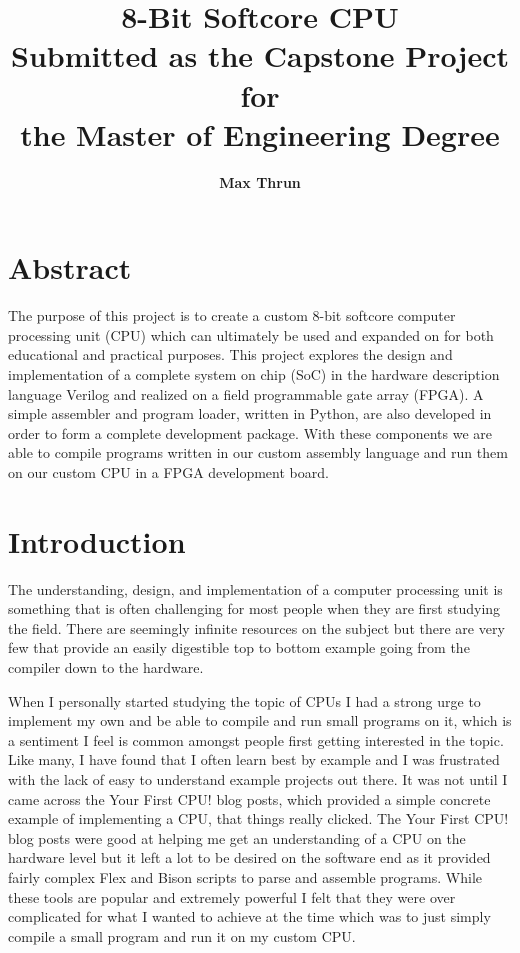 \documentclass[10pt]{article}
\title{
    \vspace{0.5in}
    \textmd{\textbf{8-Bit Softcore CPU}}\\
    \vspace{2in}
    \textmd{\textbf{Submitted as the Capstone Project for\\the Master of Engineering Degree}}\\
    \vfill
}
\author{\textbf{Max Thrun}}
\begin{document}
\clearpage\maketitle
\thispagestyle{empty}
\newpage
\section{Abstract}

The purpose of this project is to create a custom 8-bit softcore computer
processing unit (CPU) which can ultimately be used and expanded on for both
educational and practical purposes. This project explores the design and
implementation of a complete system on chip (SoC) in the hardware description
language Verilog and realized on a field programmable gate array (FPGA). A
simple assembler and program loader, written in Python, are also developed in
order to form a complete development package. With these components we are able
to compile programs written in our custom assembly language and run them on our
custom CPU in a FPGA development board.

\section{Introduction}

The understanding, design, and implementation of a computer processing unit is
something that is often challenging for most people when they are first
studying the field. There are seemingly infinite resources on the subject but
there are very few that provide an easily digestible top to bottom example
going from the compiler down to the hardware.

When I personally started studying the topic of CPUs I had a strong urge to
implement my own and be able to compile and run small programs on it, which is a
sentiment I feel is common amongst people first getting interested in the
topic.  Like many, I have found that I often learn best by example and I was
frustrated with the lack of easy to understand example projects out
there. It was not until I came across the Your First CPU! \cite{yfcpu} blog
posts, which provided a simple concrete example of implementing a CPU, that
things really clicked. The Your First CPU!  blog posts were good at helping me
get an understanding of a CPU on the hardware level but it left a lot to be
desired on the software end as it provided fairly complex Flex and Bison
\cite{flex} scripts to parse and assemble programs. While these tools are
popular and extremely powerful I felt that they were over complicated for what
I wanted to achieve at the time which was to just simply compile a small
program and run it on my custom CPU.
\end{document}
